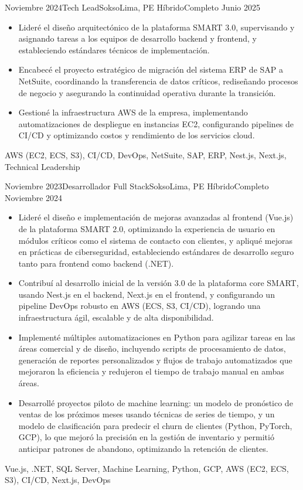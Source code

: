 \begin{experiences}
\experience
  {Noviembre 2024}{Tech Lead}{Sokso}{Lima, PE}
  {Híbrido}{Completo}
  {Junio 2025} {
    \begin{itemize}
      \item Lideré el diseño arquitectónico de la plataforma SMART 3.0, supervisando y asignando tareas a los equipos de desarrollo backend y frontend, y estableciendo estándares técnicos de implementación.
      \item Encabecé el proyecto estratégico de migración del sistema ERP de SAP a NetSuite, coordinando la transferencia de datos críticos, rediseñando procesos de negocio y asegurando la continuidad operativa durante la transición.
      \item Gestioné la infraestructura AWS de la empresa, implementando automatizaciones de despliegue en instancias EC2, configurando pipelines de CI/CD y optimizando costos y rendimiento de los servicios cloud.
    \end{itemize}
  }
  {{AWS (EC2, ECS, S3)}, CI/CD, DevOps, NetSuite, SAP, ERP, Nest.js, Next.js, Technical Leadership}

\experience
  {Noviembre 2023}{Desarrollador Full Stack}{Sokso}{Lima, PE}
  {Híbrido}{Completo}
  {Noviembre 2024} {
    \begin{itemize}
      \item Lideré el diseño e implementación de mejoras avanzadas al frontend (Vue.js) de la plataforma SMART 2.0, optimizando la experiencia de usuario en módulos críticos como el sistema de contacto con clientes, y apliqué mejoras en prácticas de ciberseguridad, estableciendo estándares de desarrollo seguro tanto para frontend como backend (.NET).
      \item Contribuí al desarrollo inicial de la versión 3.0 de la plataforma core SMART, usando Nest.js en el backend, Next.js en el frontend, y configurando un pipeline DevOps robusto en AWS (ECS, S3, CI/CD), logrando una infraestructura ágil, escalable y de alta disponibilidad.
      \item Implementé múltiples automatizaciones en Python para agilizar tareas en las áreas comercial y de diseño, incluyendo scripts de procesamiento de datos, generación de reportes personalizados y flujos de trabajo automatizados que mejoraron la eficiencia y redujeron el tiempo de trabajo manual en ambas áreas.
      \item Desarrollé proyectos piloto de machine learning: un modelo de pronóstico de ventas de los próximos meses usando técnicas de series de tiempo, y un modelo de clasificación para predecir el churn de clientes (Python, PyTorch, GCP), lo que mejoró la precisión en la gestión de inventario y permitió anticipar patrones de abandono, optimizando la retención de clientes.
    \end{itemize}
  }
  {Vue.js, .NET, SQL Server, Machine Learning, Python, GCP, {AWS (EC2, ECS, S3)}, CI/CD, Next.js, DevOps}


\end{experiences}
